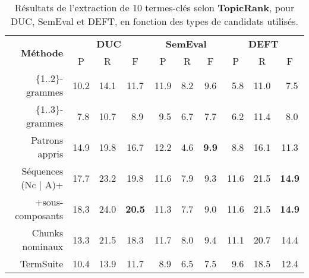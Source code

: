     \begin{table}
      \centering
      \begin{tabular}{@{~~}rc@{~~~}c@{~~~}cc@{~~~}c@{~~~}cc@{~~~}c@{~~~}c@{~~}}
        \toprule
        \multirow{2}{*}[-2pt]{\textbf{Méthode}} & \multicolumn{3}{c}{\textbf{DUC}} & \multicolumn{3}{c}{\textbf{SemEval}} & \multicolumn{3}{c}{\textbf{DEFT}}\\
        \cmidrule(r){2-4}\cmidrule(lr){5-7}\cmidrule(l){8-10}
        & P & R & F & P & R & F & P & R & F\\
        \midrule
        \{1..2\}-grammes & 10.2 & 14.1 & 11.7 & 11.9 & $~~$8.2 & $~~$9.6 & $~~$5.8 & 11.0 & $~~$7.5\\
        \{1..3\}-grammes & $~~$7.8 & 10.7 & $~~$8.9 & $~~$9.5 & $~~$6.7 & $~~$7.7 & $~~$6.2 & 11.4 & $~~$8.0\\
        Patrons appris & 14.9 & 19.8 & 16.7 & 12.2 & $~~$4.6 & \textbf{$~~$9.9} & $~~$8.8 & 16.1 & 11.3\\
        Séquences (Nc | A)+ & 17.7 & 23.2 & 19.8 & 11.6 & $~~$7.9 & $~~$9.3 & 11.6 & 21.5 & \textbf{14.9}\\
        +sous-composants & 18.3 & 24.0 & \textbf{20.5} & 11.3 & $~~$7.7 & $~~$9.0 & 11.6 & 21.5 & \textbf{14.9}\\
        Chunks nominaux& 13.3 & 21.5 & 18.3 & 11.7 & $~~$8.0 & $~~$9.4 & 11.1 & 20.7 & 14.4\\
        TermSuite & 10.4 & 13.9 & 11.7 & $~~$8.9 & $~~$6.5 & $~~$7.5 & $~~$9.6 & 18.5 & 12.4\\
        \bottomrule
      \end{tabular}
      \caption{Résultats de l'extraction de $10$ termes-clés selon
               \textbf{TopicRank}, pour DUC, SemEval et DEFT, en fonction des
               types de candidats utilisés. 
               \label{tab:resultats_de_topicrank}}
    \end{table}

